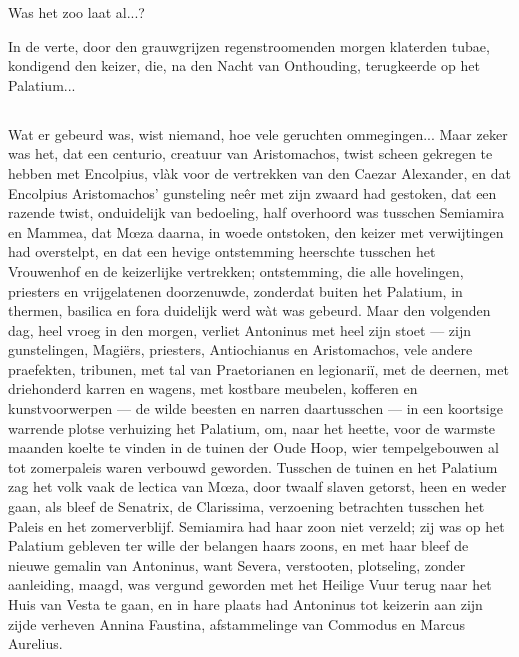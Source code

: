 \documentclass[a4paper, 12pt, oneside, dutch]{article}
\begin{document}
Was het zoo laat al...?

In de verte, door den grauwgrijzen regenstroomenden morgen klaterden tubae, kondigend den keizer, die, na den Nacht van Onthouding, terugkeerde op het Palatium...

\subsection{}
\paragraph{}
Wat er gebeurd was, wist niemand, hoe vele geruchten ommegingen... Maar zeker was het, dat een centurio, creatuur van Aristomachos, twist scheen gekregen te hebben met Encolpius, vlàk voor de vertrekken van den Caezar Alexander, en dat Encolpius Aristomachos' gunsteling neêr met zijn zwaard had gestoken, dat een razende twist, onduidelijk van bedoeling, half overhoord was tusschen Semiamira en Mammea, dat Mœza daarna, in woede ontstoken, den keizer met verwijtingen had overstelpt, en dat een hevige ontstemming heerschte tusschen het Vrouwenhof en de keizerlijke vertrekken; ontstemming, die alle hovelingen, priesters en vrijgelatenen doorzenuwde, zonderdat buiten het Palatium, in thermen, basilica en fora duidelijk werd wàt was gebeurd. Maar den volgenden dag, heel vroeg in den morgen, verliet Antoninus met heel zijn stoet --- zijn gunstelingen, Magiërs, priesters, Antiochianus en Aristomachos, vele andere praefekten, tribunen, met tal van Praetorianen en legionariï, met de deernen, met driehonderd karren en wagens, met kostbare meubelen, kofferen en kunstvoorwerpen --- de wilde beesten en narren daartusschen --- in een koortsige warrende plotse verhuizing het Palatium, om, naar het heette, voor de warmste maanden koelte te vinden in de tuinen der Oude Hoop, wier tempelgebouwen al tot zomerpaleis waren verbouwd geworden. Tusschen de tuinen en het Palatium zag het volk vaak de lectica van Mœza, door twaalf slaven getorst, heen en weder gaan, als bleef de Senatrix, de Clarissima, verzoening betrachten tusschen het Paleis en het zomerverblijf. Semiamira had haar zoon niet verzeld; zij was op het Palatium gebleven ter wille der belangen haars zoons, en met haar bleef de nieuwe gemalin van Antoninus, want Severa, verstooten, plotseling, zonder aanleiding, maagd, was vergund geworden met het Heilige Vuur terug naar het Huis van Vesta te gaan, en in hare plaats had Antoninus tot keizerin aan zijn zijde verheven Annina Faustina, afstammelinge van Commodus en Marcus Aurelius.
\end{document}
